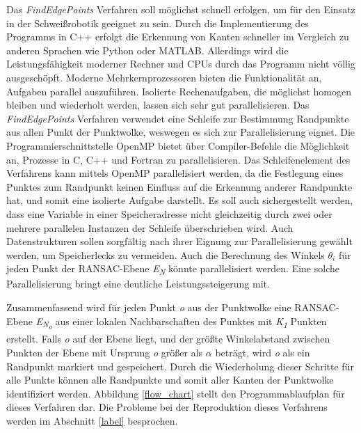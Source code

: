 Das \textit{FindEdgePoints} Verfahren soll möglichst schnell erfolgen, um für den Einsatz in der Schweißrobotik geeignet zu sein. Durch die Implementierung des Programms in C++ erfolgt die Erkennung von Kanten schneller im Vergleich zu anderen Sprachen wie Python oder MATLAB. Allerdings wird die Leistungsfähigkeit moderner Rechner und CPUs durch das Programm nicht völlig ausgeschöpft. Moderne Mehrkernprozessoren bieten die Funktionalität an, Aufgaben parallel auszuführen. Isolierte Rechenaufgaben, die möglichst homogen bleiben und wiederholt werden, lassen sich sehr gut parallelisieren. Das \textit{FindEdgePoints} Verfahren verwendet eine Schleife zur Bestimmung Randpunkte aus allen Punkt der Punktwolke, weswegen es sich zur Parallelisierung eignet. Die Programmierschnittstelle OpenMP bietet über Compiler-Befehle die Möglichkeit an, Prozesse in C, C++ und Fortran zu parallelisieren. Das Schleifenelement des Verfahrens kann mittels OpenMP parallelisiert werden, da die Festlegung eines Punktes zum Randpunkt keinen Einfluss auf die Erkennung anderer Randpunkte hat, und somit eine isolierte Aufgabe darstellt. Es soll auch sichergestellt werden, dass eine Variable in einer Speicheradresse nicht gleichzeitig durch zwei oder mehrere parallelen Instanzen der Schleife überschrieben wird. Auch Datenstrukturen sollen sorgfältig nach ihrer Eignung zur Parallelisierung gewählt werden, um Speicherlecks zu vermeiden. Auch die Berechnung des Winkels $\theta_i$ für jeden Punkt der RANSAC-Ebene \textit{E\textsubscript{N}} könnte parallelisiert werden. Eine solche Parallelisierung bringt eine deutliche Leistungssteigerung mit. 

Zusammenfassend wird für jeden Punkt \textit{o} aus der Punktwolke eine RANSAC-Ebene \textit{E\textsubscript{N\textsubscript{o}}} aus einer lokalen Nachbarschaften des Punktes mit \textit{K\textsubscript{1}} Punkten erstellt. Falls \textit{o} auf der Ebene liegt, und der größte Winkelabstand zwischen Punkten der Ebene mit Ursprung \textit{o} größer als $\alpha$ beträgt, wird \textit{o} als ein Randpunkt markiert und gespeichert. Durch die Wiederholung dieser Schritte für alle Punkte können alle Randpunkte und somit aller Kanten der Punktwolke identifiziert werden. Abbildung \ref{flow_chart} stellt den Programmablaufplan für dieses Verfahren dar. Die Probleme bei der Reproduktion dieses Verfahrens werden im Abschnitt \ref{label} besprochen.


